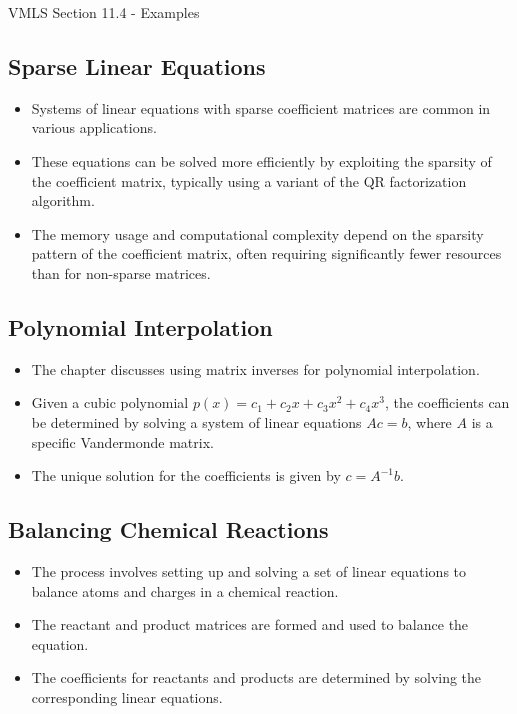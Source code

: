 \begin{notes}{VMLS Section 11.4 - Examples}
    \subsection*{Sparse Linear Equations}
    \begin{itemize}
        \item Systems of linear equations with sparse coefficient matrices are common in various applications. 
        \item These equations can be solved more efficiently by exploiting the sparsity of the coefficient matrix, typically using a variant of the QR factorization algorithm.
        \item The memory usage and computational complexity depend on the sparsity pattern of the coefficient matrix, often requiring significantly fewer resources than for non-sparse matrices.
    \end{itemize}

    \subsection*{Polynomial Interpolation}
    \begin{itemize}
        \item The chapter discusses using matrix inverses for polynomial interpolation. 
        \item Given a cubic polynomial $p(x) = c_1 + c_2x + c_3x^2 + c_4x^3$, the coefficients can be determined by solving a system of linear equations $Ac = b$, where $A$ is a specific Vandermonde 
        matrix.
        \item The unique solution for the coefficients is given by $c = A^{-1}b$.
    \end{itemize}

    \subsection*{Balancing Chemical Reactions}
    \begin{itemize}
        \item The process involves setting up and solving a set of linear equations to balance atoms and charges in a chemical reaction.
        \item The reactant and product matrices are formed and used to balance the equation. 
        \item The coefficients for reactants and products are determined by solving the corresponding linear equations.
    \end{itemize}


\end{notes}
